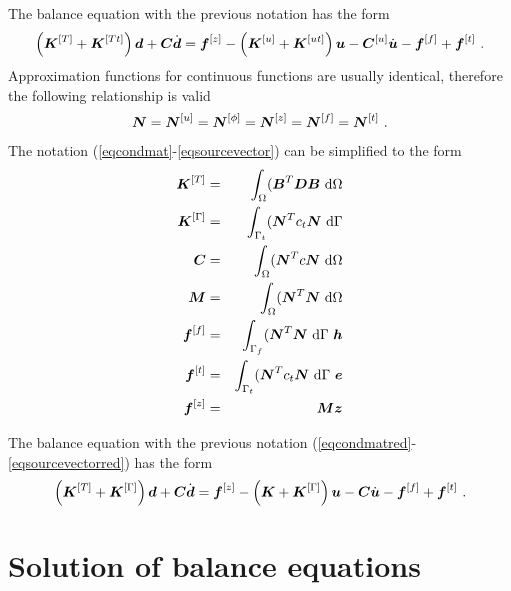 The balance equation with the previous notation has the form
\begin{eqnarray}
\left(\mbox{\boldmath$K$}^{[T]}+\mbox{\boldmath$K$}^{[Tt]}\right) \mbox{\boldmath$d$} + \mbox{\boldmath$C$} \dot{\mbox{\boldmath$d$}} = 
\mbox{\boldmath$f$}^{[z]} - \left(\mbox{\boldmath$K$}^{[u]}+\mbox{\boldmath$K$}^{[ut]}\right) \mbox{\boldmath$u$} -
\mbox{\boldmath$C$}^{[u]} \dot{\mbox{\boldmath$u$}} - \mbox{\boldmath$f$}^{[f]} + \mbox{\boldmath$f$}^{[t]}\ .
\end{eqnarray}
Approximation functions for continuous functions are usually identical, therefore the following
relationship is valid
\begin{eqnarray}
\mbox{\boldmath$N$} = \mbox{\boldmath$N$}^{[u]} = \mbox{\boldmath$N$}^{[\phi]} = \mbox{\boldmath$N$}^{[z]} = \mbox{\boldmath$N$}^{[f]} = \mbox{\boldmath$N$}^{[t]}\ .
\end{eqnarray}
The notation (\ref{eqcondmat}-\ref{eqsourcevector}) can be simplified to the form
\begin{eqnarray}\label{eqcondmatred}
\mbf{K}^{[T]} &=& \int_{\Omega} (\mbf{B}^T \mbf{D} \mbf{B}{\ \rm d}\Omega
\\
\mbf{K}^{[\Gamma]} &=& \int_{\Gamma_t} (\mbf{N}^T c_t \mbf{N}{\ \rm d}\Gamma
\\
\mbf{C} &=& \int_{\Omega} (\mbf{N}^T c \mbf{N} {\ \rm d}\Omega
\\
\mbf{M} &=& \int_{\Omega} (\mbf{N}^T \mbf{N} {\ \rm d}\Omega
\\
\mbf{f}^{[f]} &=& \int_{\Gamma_f} (\mbf{N}^T  \mbf{N} {\ \rm d}\Gamma\ \mbf{h}
\\
\mbf{f}^{[t]} &=& \int_{\Gamma_t} (\mbf{N}^T  c_t \mbf{N} {\ \rm d}\Gamma\ \mbf{e}
\\ \label{eqsourcevectorred}
\mbf{f}^{[z]} &=& \mbf{M} \mbf{z}
\end{eqnarray}

The balance equation with the previous notation (\ref{eqcondmatred}-\ref{eqsourcevectorred}) has the form
\begin{eqnarray}\label{eqbalanceeq}
\left(\mbox{\boldmath$K$}^{[T]}+\mbox{\boldmath$K$}^{[\Gamma]}\right) \mbox{\boldmath$d$} + \mbox{\boldmath$C$} \dot{\mbox{\boldmath$d$}} = 
\mbox{\boldmath$f$}^{[z]} - \left(\mbox{\boldmath$K$}+\mbox{\boldmath$K$}^{[\Gamma]}\right) \mbox{\boldmath$u$} -
\mbox{\boldmath$C$} \dot{\mbox{\boldmath$u$}} - \mbox{\boldmath$f$}^{[f]} + \mbox{\boldmath$f$}^{[t]}\ .
\end{eqnarray}

\section{Solution of balance equations}

